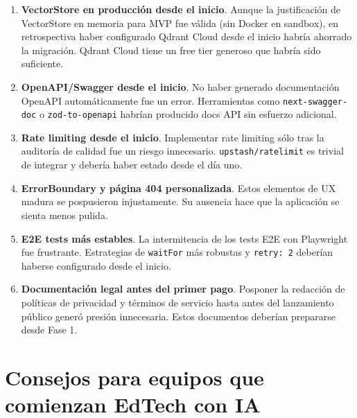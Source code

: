 \begin{enumerate}[leftmargin=1.6em]
\item \textbf{VectorStore en producción desde el inicio}. Aunque la justificación de VectorStore en memoria para MVP fue válida (sin Docker en sandbox), en retrospectiva haber configurado Qdrant Cloud desde el inicio habría ahorrado la migración. Qdrant Cloud tiene un free tier generoso que habría sido suficiente.

\item \textbf{OpenAPI/Swagger desde el inicio}. No haber generado documentación OpenAPI automáticamente fue un error. Herramientas como \texttt{next-swagger-doc} o \texttt{zod-to-openapi} habrían producido docs API sin esfuerzo adicional.

\item \textbf{Rate limiting desde el inicio}. Implementar rate limiting sólo tras la auditoría de calidad fue un riesgo innecesario. \texttt{upstash/ratelimit} es trivial de integrar y debería haber estado desde el día uno.

\item \textbf{ErrorBoundary y página 404 personalizada}. Estos elementos de UX madura se pospusieron injustamente. Su ausencia hace que la aplicación se sienta menos pulida.

\item \textbf{E2E tests más estables}. La intermitencia de los tests E2E con Playwright fue frustrante. Estrategias de \texttt{waitFor} más robustas y \texttt{retry: 2} deberían haberse configurado desde el inicio.

\item \textbf{Documentación legal antes del primer pago}. Posponer la redacción de políticas de privacidad y términos de servicio hasta antes del lanzamiento público generó presión innecesaria. Estos documentos deberían prepararse desde Fase 1.
\end{enumerate}

\section{Consejos para equipos que comienzan EdTech con IA}


